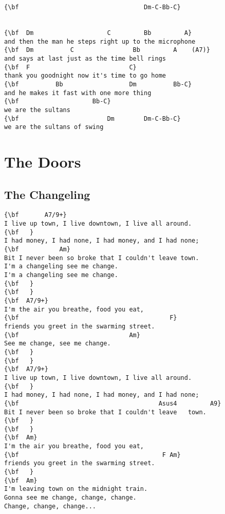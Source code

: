 \documentclass[a4paper]{article}
\begin{document}
\begin{Verbatim}[commandchars=\\\{\}]
{\bf                                  Dm-C-Bb-C}


{\bf  Dm                    C         Bb         A}
and then the man he steps right up to the microphone
{\bf  Dm          C                Bb         A    (A7)}
and says at last just as the time bell rings
{\bf  F                           C}
thank you goodnight now it's time to go home
{\bf          Bb                  Dm          Bb-C}
and he makes it fast with one more thing
{\bf                    Bb-C}
we are the sultans
{\bf                        Dm        Dm-C-Bb-C}
we are the sultans of swing

\end{Verbatim}
\newpage
\section{The Doors}
\subsection{The Changeling}
\begin{Verbatim}[commandchars=\\\{\}]
{\bf  	   A7/9+}
I live up town, I live downtown, I live all around.
{\bf   }
I had money, I had none, I had money, and I had none;
{\bf           Am}
Bit I never been so broke that I couldn't leave town.
I'm a changeling see me change.
I'm a changeling see me change.
{\bf   }
{\bf   }
{\bf  A7/9+}
I'm the air you breathe, food you eat,
{\bf                                         F}
friends you greet in the swarming street.
{\bf                              Am}
See me change, see me change.
{\bf   }
{\bf   }
{\bf  A7/9+}
I live up town, I live downtown, I live all around.
{\bf   }
I had money, I had none, I had money, and I had none;
{\bf                                      Asus4         A9}
Bit I never been so broke that I couldn't leave   town.
{\bf   }
{\bf   }
{\bf  Am}
I'm the air you breathe, food you eat,
{\bf                                       F Am}
friends you greet in the swarming street.
{\bf   }
{\bf  Am}
I'm leaving town on the midnight train.
Gonna see me change, change, change.
Change, change, change...

\end{Verbatim}
\newpage
\end{document}

